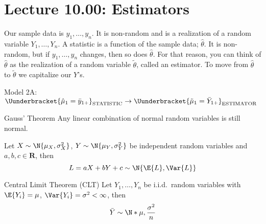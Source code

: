 \section{Lecture 10.00: Estimators}
Our sample data is $ y_1,\ldots,y_n $.
It is non-random and is a realization of a random
variable $ Y_1,\ldots,Y_n $. A statistic is a function
of the sample data; $ \hat{\theta} $. It is non-random,
but if $ y_1,\ldots,y_n $ changes, then so does $ \hat{\theta} $.
For that reason, you can think of $ \hat{\theta} $
as the realization of a random variable $ \tilde{\theta} $,
called an estimator. To move from $ \hat{\theta} $
to $ \tilde{\theta} $ we capitalize our $ Y $'s.

\begin{Example}{}{}
    Model 2A\@:
    $ \displaystyle \Uunderbracket{\hat{\mu}_1=\bar{y}_{1+}}_{\text{STATISTIC}}\to
        \Uunderbracket{\tilde{\mu}_1=\bar{Y}_{1+}}_{\text{ESTIMATOR}} $
\end{Example}
\begin{Theorem}{Gauss' Theorem}{}
    Any linear combination of normal random variables is still normal.
\end{Theorem}
\begin{Example}{}{}
    Let $ X\sim\N{\mu_X,\sigma_X^2} $, $ Y \sim \N{\mu_Y,\sigma^2_Y} $
    be independent random variables and $ a,b,c\in\mathbf{R} $, then
    \[ L=aX+bY+c\sim\N{\E{L},\Var{L}} \]
\end{Example}
\begin{Theorem}{Central Limit Theorem (CLT)}{}
    Let $ Y_1,\ldots,Y_n $ be i.i.d.\ random variables with
    $ \E{Y_i}=\mu $, $ \Var{Y_i}=\sigma^2<\infty $, then
    \[ \bar{Y} \sim \N*{\mu,\frac{\sigma^2}{n}} \]
\end{Theorem}
